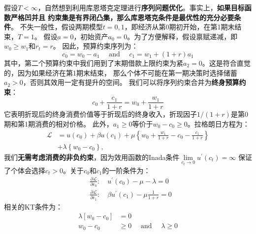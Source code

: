 假设$T<\infty$，自然想到利用库恩塔克定理进行\textbf{序列问题优化}。事实上，\textbf{如果目标函数严格凹并且
约束集是有界闭凸集，那么库恩塔克条件是最优性的充分必要条件}。
不失一般性，假设两期模型$t=0,1$，即经济从第0期初开始，在第1期末结束，$T=1$。
假设$\underbar{a}=0$，初始资产$a_0 = 0$。为了方便解释，假设禀赋递减，即$w_0\geq w_1$和$r_t = r$。
因此，预算约束序列为：
\begin{equation*}
    c_0=w_0-a_1 \quad \text { and } \quad c_1=w_1+(1+r) a_1
\end{equation*}
其中，第二个预算约束中我们用到了末期借款上限约束为紧$a_2=0$。这是符合直觉的，因为如果经济在第1期末结束，
那么个体不可能在第一期决策时选择储蓄$a_2>0$，否则其效用一定有提升的空间。
我们可以将序列约束合并为\textbf{终身预算约束}：
\begin{equation*}
    c_0+\frac{c_1}{1+r}=w_0+\frac{w_1}{1+r}
\end{equation*}
它表明折现后的终身消费价值等于折现后的终身收入，折现因子$1/(1+r)$是第0期和第1期消费的相对价格。
此外，$a_1\geq 0$等价于$w_0-c_0\geq 0$。拉格朗日方程为：
\begin{equation*}
    \begin{aligned}
        \mathcal{L} 
            &= u\left(c_0\right)+\beta u\left(c_1\right)+\mu\left\{w_0+\frac{w_1}{1+r}-c_0-\frac{c_1}{1+r}\right\} \\
            &+ \lambda\left\{w_0-c_0\right\},
    \end{aligned}
\end{equation*}
我们\textbf{无需考虑消费的非负约束}，因为效用函数的Inada条件$\lim\limits_{c_t\rightarrow 0}u^{\prime}(c_t)=\infty$
保证了个体会选择$c_t>0$。关于$c_0$和$c_1$的一阶条件为：
\begin{equation*}
    \begin{aligned}
        & \frac{\partial \mathcal{L}}{\partial c_0}: \quad u^{\prime}\left(c_0\right)-\mu-\lambda=0 \\
        & \frac{\partial \mathcal{L}}{\partial c_1}: \quad \beta u^{\prime}\left(c_1\right)-\mu \frac{1}{1+r}=0
    \end{aligned}
\end{equation*}
相关的KT条件为：
\begin{equation*}
    \begin{aligned}
        \lambda\left[w_0-c_0\right] & =0 \\
        w_0-c_0 & \geq 0 \quad \text { and } \quad \lambda \geq 0
    \end{aligned}
\end{equation*}

